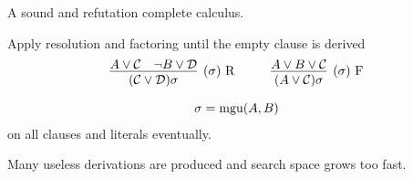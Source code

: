 
		A sound and refutation complete calculus.
	\END
	
	\BEGINX
		Apply resolution and factoring until the empty clause is derived 
		\begin{gather*}
			\infer
			[(\sigma)\text{ R}]
			{(\mcC \lor \mcD)\sigma}
			{{A} \lor\mcC & {\lnot B} \lor\mcD}
			\hspace{1cm}
			\infer
			[(\sigma)\text{ F}]
			{(A \lor \mcC)\sigma}
			{{A}\lor B\lor\mcC} \\[0.7em]
			\sigma = \mgu(A,B)
		\end{gather*}
		on all clauses and literals eventually.
	\ENDX
	
		Many useless derivations are produced and search space grows too fast.
	\END